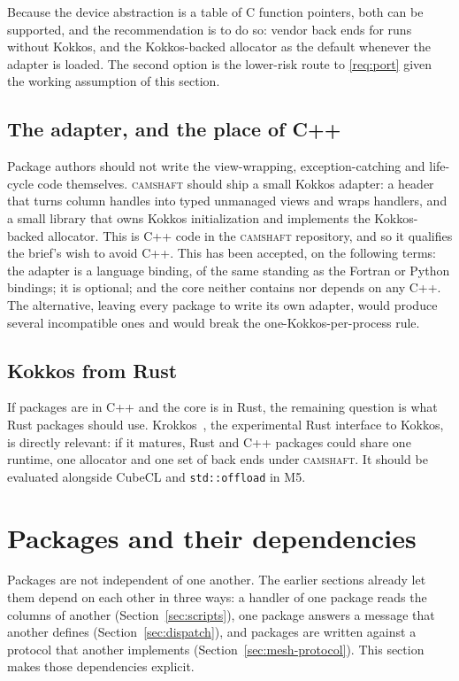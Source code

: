 \documentclass[11pt,a4paper]{article}
\newcommand{\camshaft}{\textsc{camshaft}}
\newcommand{\code}[1]{\texttt{#1}}
\begin{document}
Because the device abstraction is a table of C function pointers, both can be
supported, and the recommendation is to do so: vendor back ends for runs
without Kokkos, and the Kokkos-backed allocator as the default whenever the
adapter is loaded.  The second option is the lower-risk route to
\ref{req:port} given the working assumption of this section.

\subsection{The adapter, and the place of C++}

Package authors should not write the view-wrapping, exception-catching and
life-cycle code themselves.  \camshaft{} should ship a small Kokkos adapter: a
header that turns column handles into typed unmanaged views and wraps
handlers, and a small library that owns Kokkos initialization and implements
the Kokkos-backed allocator.  This is C++ code in the \camshaft{} repository, and
so it qualifies the brief's wish to avoid C++.  This has been accepted, on
the following terms: the adapter is a language binding, of the same standing
as the Fortran or Python bindings; it is optional; and the core neither
contains nor depends on any C++.  The alternative, leaving every package to write its
own adapter, would produce several incompatible ones and would break the
one-Kokkos-per-process rule.

\subsection{Kokkos from Rust}

If packages are in C++ and the core is in Rust, the remaining question is
what Rust packages should use.  Krokkos~\cite{krokkos}, the experimental Rust
interface to Kokkos, is directly relevant: if it matures, Rust and C++
packages could share one runtime, one allocator and one set of back ends
under \camshaft{}.  It should be evaluated alongside CubeCL and
\code{std::offload} in M5.

\section{Packages and their dependencies}
\label{sec:packages}

Packages are not independent of one another.  The earlier sections already
let them depend on each other in three ways: a handler of one package reads
the columns of another (Section~\ref{sec:scripts}), one package answers a
message that another defines (Section~\ref{sec:dispatch}), and packages are
written against a protocol that another implements
(Section~\ref{sec:mesh-protocol}).  This section makes those dependencies
explicit.
\end{document}
